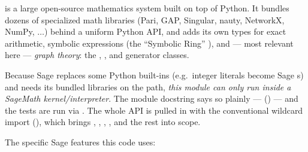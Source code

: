  is a large open-source mathematics system built on top of Python.
It bundles dozens of specialized math libraries (Pari, GAP, Singular, nauty,
NetworkX, NumPy, $\ldots$) behind a uniform Python API, and adds its own types
for exact arithmetic, symbolic expressions (the ``Symbolic Ring'' ),
and --- most relevant here --- \emph{graph theory}: the , ,
and  generator classes.

Because Sage replaces some Python built-ins (e.g.\ integer literals become Sage
s) and needs its bundled libraries on the path, \emph{this module
can only run inside a SageMath kernel/interpreter}. The module docstring says so
plainly --- 
() --- and the tests are run via . The whole API is pulled in with the conventional wildcard
import  (),
which brings , , , , and the
rest into scope.

The specific Sage features this code uses:

